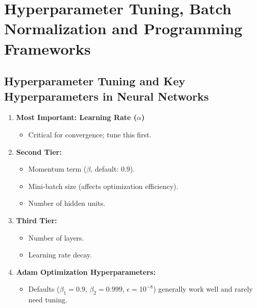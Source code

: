\documentclass[letterpaper,12pt,notitlepage,twoside]{report}
\begin{document}
\section{Hyperparameter Tuning, Batch Normalization and Programming Frameworks}

\subsection{Hyperparameter Tuning and Key Hyperparameters in Neural Networks}
\begin{enumerate}[nosep]
    \item \textbf{Most Important: Learning Rate ($\alpha$)}  
    \begin{itemize}
        \item Critical for convergence; tune this first.
    \end{itemize}
    \item \textbf{Second Tier:}
    \begin{itemize}
        \item Momentum term ($\beta$, default: 0.9).
        \item Mini-batch size (affects optimization efficiency).
        \item Number of hidden units.
    \end{itemize}
    \item \textbf{Third Tier:}
    \begin{itemize}
        \item Number of layers.
        \item Learning rate decay.
    \end{itemize}
    \item \textbf{Adam Optimization Hyperparameters:}  
    \begin{itemize}
        \item Defaults ($\beta_1 = 0.9$, $\beta_2 = 0.999$, $\epsilon = 10^{-8}$) generally work well and rarely need tuning.
    \end{itemize}
\end{enumerate}
\end{document}

